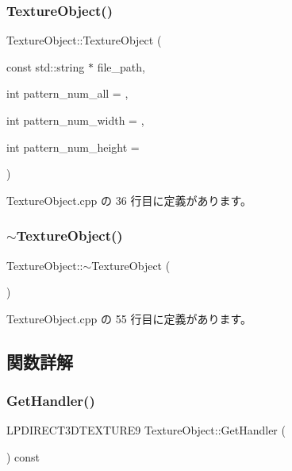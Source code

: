 \subsubsection{\texorpdfstring{Texture\+Object()}{TextureObject()}}
{\footnotesize\ttfamily Texture\+Object\+::\+Texture\+Object (\begin{DoxyParamCaption}\item[{const std\+::string $\ast$}]{file\+\_\+path,  }\item[{int}]{pattern\+\_\+num\+\_\+all = {},  }\item[{int}]{pattern\+\_\+num\+\_\+width = {},  }\item[{int}]{pattern\+\_\+num\+\_\+height = {} }\end{DoxyParamCaption})}



 Texture\+Object.\+cpp の 36 行目に定義があります。

\mbox{\label{class_texture_object_aeed25fa5ca8e892b96145f4a649e090a}} 
\subsubsection{\texorpdfstring{$\sim$\+Texture\+Object()}{~TextureObject()}}
{\footnotesize\ttfamily Texture\+Object\+::$\sim$\+Texture\+Object (\begin{DoxyParamCaption}{ }\end{DoxyParamCaption})\hspace{0.3cm}{\ttfamily [virtual]}}



 Texture\+Object.\+cpp の 55 行目に定義があります。



\subsection{関数詳解}
\mbox{\label{class_texture_object_a1b6c93f36e03686f7198b93355c73c8a}} 
\subsubsection{\texorpdfstring{Get\+Handler()}{GetHandler()}}
{\footnotesize\ttfamily L\+P\+D\+I\+R\+E\+C\+T3\+D\+T\+E\+X\+T\+U\+R\+E9 Texture\+Object\+::\+Get\+Handler (\begin{DoxyParamCaption}{ }\end{DoxyParamCaption}) const\hspace{0.3cm}{\ttfamily [inline]}}



